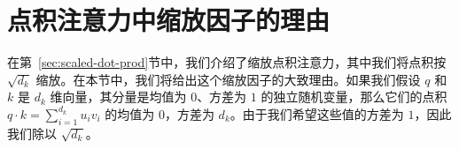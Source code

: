 \section*{点积注意力中缩放因子的理由}

在第~\ref{sec:scaled-dot-prod}节中，我们介绍了缩放点积注意力，其中我们将点积按 $\sqrt{d_k}$ 缩放。在本节中，我们将给出这个缩放因子的大致理由。如果我们假设 $q$ 和 $k$ 是 $d_k$ 维向量，其分量是均值为 $0$、方差为 $1$ 的独立随机变量，那么它们的点积 $q \cdot k = \sum_{i=1}^{d_k} u_iv_i$ 的均值为 $0$，方差为 $d_k$。由于我们希望这些值的方差为 $1$，因此我们除以 $\sqrt{d_k}$。


\iffalse

在本节中，我们将给出这个缩放因子的大致理由，即我们将证明对于任意两个向量 $\vec{u}$ 和 $\vec{v}$，其方差和均值分别为 $1$ 和 $0$，点积的方差和均值分别为 $d_k$ 和 $0$。因此，除以 $\sqrt{d_k}$ 确保注意力 logits 的每个分量都被归一化。每个 Transformer 层中的重复层归一化鼓励 $\vec{u}$ 和 $\vec{v}$ 被归一化。

\begin{align*}
    E[<\vec{u},\vec{v}>] & =  \sum_k E[u_i v_i] &\text{由期望的线性性} \\
    & =\sum_k E[u_i]E[v_i] & \text{假设独立性} \\
    & = 0
\end{align*}

\begin{align*}
    E[(<\vec{u},\vec{v}>-E[<\vec{u},\vec{v}>])^2]  & = E[(<\vec{u},\vec{v}>)^2] - E[<\vec{u},\vec{v}>]^2 \\
    & = E[(<\vec{u},\vec{v}>)^2] \\
    & =  \sum_k E[{u_i}^2] E[{v_i}^2] &\text{由期望的线性性和独立性} \\
    & = d_k
\end{align*}

\fi
